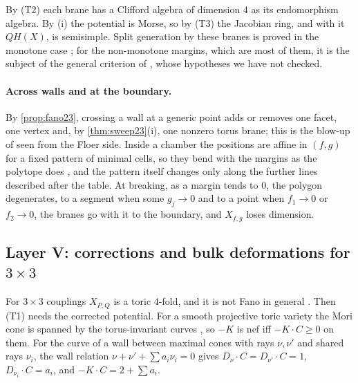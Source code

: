 \documentclass[11pt]{article}
\theoremstyle{definition}
\theoremstyle{remark}
\begin{document}
By (T2) each brane has a Clifford algebra of dimension $4$ as its endomorphism algebra. By (i) the potential is Morse, so by (T3) the Jacobian ring,
and with it $QH(X)$, is semisimple. Split generation by these branes is proved in the monotone case \cite{Ritter2016,EvansLekili2019}; for the
non-monotone margins, which are most of them, it is the subject of the general criterion of \cite{AFOOO2026}, whose hypotheses we have not checked.

\paragraph{Across walls and at the boundary.} By \cref{prop:fano23}, crossing a wall at a generic point adds or removes one facet, one vertex and,
by \cref{thm:sweep23}(i), one nonzero torus brane; this is the blow-up of \cite[Prop.~10.6]{Conditionals} seen from the Floer side. Inside a chamber the
positions are affine in $(f,g)$ for a fixed pattern of minimal cells, so they bend with the margins as the
polytope does \cite[Thm.~3.3]{Bands}, and the pattern itself changes only along the further lines described after the table. At breaking, as a margin tends to $0$, the polygon degenerates, to a segment when some $g_j\to0$ and
to a point when $f_1\to0$ or $f_2\to0$, the branes go with it to the boundary, and $X_{f,g}$ loses dimension.

\subsection{Layer V: corrections and bulk deformations for $3\times3$}\label{sec:layerV}

For $3\times3$ couplings $X_{P,Q}$ is a toric $4$-fold, and it is not Fano in general \cite[Prop.~6.3]{Family}. Then (T1) needs the
corrected potential. For a smooth projective toric variety the Mori cone is spanned by the torus-invariant curves \cite[Thm.~6.3.20]{CoxLittleSchenck2011},
so $-K$ is nef iff $-K\cdot C\ge0$ on them. For the curve of a wall between maximal cones with rays $\nu,\nu'$ and shared rays $\nu_i$,
the wall relation $\nu+\nu'+\sum a_i\nu_i=0$ gives $D_\nu\cdot C=D_{\nu'}\cdot C=1$, $D_{\nu_i}\cdot C=a_i$, and $-K\cdot C=2+\sum a_i$.
\end{document}
